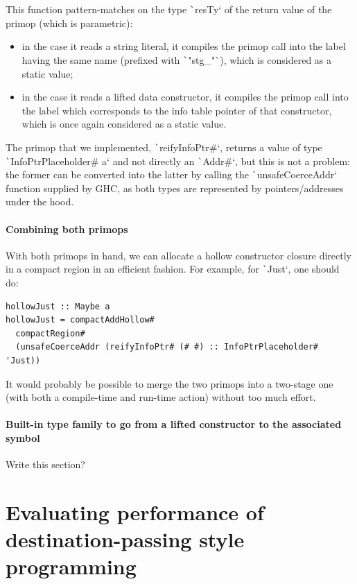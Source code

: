 \documentclass[english]{jflart}
\newcommand{\TODO}[1]{{\color{red}\large #1}}
\begin{document}
This function pattern-matches on the type \texttt`resTy` of the return value of the primop (which is parametric):
\begin{itemize}
  \item in the case it reads a string literal, it compiles the primop call into the label having the same name (prefixed with \texttt`"stg_"`), which is considered as a static value;
  \item in the case it reads a lifted data constructor, it compiles the primop call into the label which corresponds to the info table pointer of that constructor, which is once again considered as a static value.
\end{itemize}

The primop that we implemented, \texttt`reifyInfoPtr#`, returns a value of type \texttt`InfoPtrPlaceholder# a` and not directly an \texttt`Addr#`, but this is not a problem: the former can be converted into the latter by calling the \texttt`unsafeCoerceAddr` function supplied by GHC, as both types are represented by pointers/addresses under the hood.

\paragraph{Combining both primops}

With both primops in hand, we can allocate a hollow constructor closure directly in a compact region in an efficient fashion. For example, for \texttt`Just`, one should do:
{\small
\begin{verbatim}
hollowJust :: Maybe a
hollowJust = compactAddHollow#
  compactRegion#
  (unsafeCoerceAddr (reifyInfoPtr# (# #) :: InfoPtrPlaceholder# 'Just))  
\end{verbatim}
}

It would probably be possible to merge the two primops into a two-stage one (with both a compile-time and run-time action) without too much effort.

\paragraph{Built-in type family to go from a lifted constructor to the associated symbol}

\TODO{Write this section?}

\section{Evaluating performance of destination-passing style programming}
\end{document}
